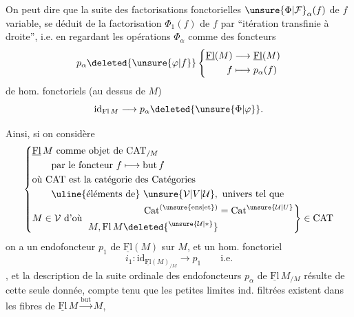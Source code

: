On peut  dire que la suite  des factorisations fonctorielles $\unsure{\Phi|\mathcal F}_\alpha(f)$ de $f$ variable, se déduit de la factorisation  $\Phi_1(f)$ de $f$
par ``itération transfinie à droite'', i.e. en regardant les opérations $\Phi_\alpha$ comme des foncteurs
\[
p_\alpha\deleted{\unsure{\varphi|f}}\left\{\begin{aligned}
\underline{\mathrm{Fl}}(M)&\longrightarrow\underline{\mathrm{Fl}}(M)\\
f&\longmapsto p_\alpha(f)
\end{aligned}\right.
\]
 de  hom. fonctoriels (au dessus de $M$)
\[\mathrm{id}_{\mathrm{Fl}\,M}\longrightarrow p_\alpha\deleted{\unsure{\Phi|\varphi}}.\]

Ainsi, si on considère
\[
\left\{\begin{aligned}
&\underline{\mathrm{Fl}}\,M\text{ comme objet de }\mathrm{CAT}_{/M}\\
&\qquad\text{par le foncteur }f\longmapsto\operatorname{but}f\\
&\text{où }\mathrm{CAT}\text{ est la catégorie des Catégories}\\
&\qquad\text{\uline{éléments de} }\unsure{\mathcal V|V|\mathcal U},\text{ univers tel que}\\
&M\in\mathcal V\text{ d'où }\left.\begin{aligned}\mathrm{Cat}^{(\unsure{\mathrm{ens}|\mathrm{et}})}&=\mathrm{Cat}^{\unsure{\mathcal U|U}}\\M,\mathrm{Fl}\,M\deleted{^{\unsure{\mathcal U|*}}}&\end{aligned}\right\}\in\mathrm{CAT}
\end{aligned}\right.
\]
on a un endofoncteur $p_1$ de $\underline{\mathrm{Fl}}(M)$ sur $M$, et un hom. fonctoriel
\[i_1:\mathrm{id}_{\underline{\mathrm{Fl}}(M)_{/M}}\longrightarrow p_1\qquad\text{i.e.}\tag*{1.13.}\]
, et la description de la suite ordinale des endofoncteurs $p_\alpha$ de $\underline{\mathrm{Fl}}\,M_{/M}$ résulte de cette seule donnée, compte tenu que les petites limites ind. filtrées existent dans les fibres de $\underline{\mathrm{Fl}}\,M\xrightarrow{\operatorname{but}}M$, 
